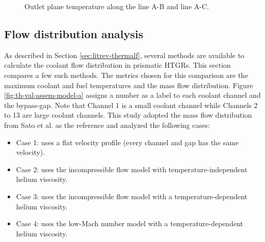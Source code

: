 \begin{figure}[htbp!]
  \centering
  \hfill
  \caption{Outlet plane temperature along the line A-B and line A-C.}
  \label{fig:th-val-assem-temps}
\end{figure}

\subsection{Flow distribution analysis}
\label{sec:flowdistrib}

As described in Section \ref{sec:litrev-thermalf}, several methods are available to calculate the coolant flow distribution in prismatic HTGRs.
This section compares a few such methods.
The metrics chosen for this comparison are the maximum coolant and fuel temperatures and the mass flow distribution.
Figure \ref{fig:th-val-assem-model-a} assigns a number as a label to each coolant channel and the bypass-gap.
Note that Channel 1 is a small coolant channel while Channels 2 to 13 are large coolant channels.
This study adopted the mass flow distribution from Sato et al. \cite{sato_computational_2010} as the reference and analyzed the following cases:
\begin{itemize}
    \item Case 1: uses a flat velocity profile (every channel and gap has the same velocity).
    \item Case 2: uses the incompressible flow model with temperature-independent helium viscosity.
    \item Case 3: uses the incompressible flow model with a temperature-dependent helium viscosity.
    \item Case 4: uses the low-Mach number model with a temperature-dependent helium viscosity.
\end{itemize}

